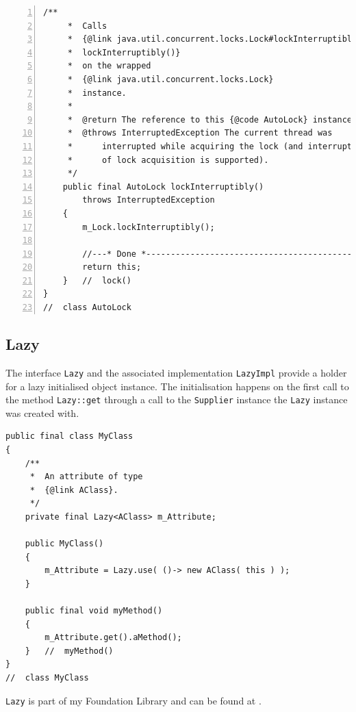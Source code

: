 \documentclass[11pt,a4paper, titlepage, parskip=half, headsepline, footsepline, cleardoublepage=current, headheight=1cm]{scrbook}
\begin{document}
\begin{lstlisting}[numbers=left,caption={AutoLock.java}]
    /**
     *  Calls
     *  {@link java.util.concurrent.locks.Lock#lockInterruptibly()
     *  lockInterruptibly()}
     *  on the wrapped
     *  {@link java.util.concurrent.locks.Lock}
     *  instance.
     *
     *  @return The reference to this {@code AutoLock} instance.
     *  @throws InterruptedException The current thread was
     *      interrupted while acquiring the lock (and interruption
     *      of lock acquisition is supported).
     */
    public final AutoLock lockInterruptibly() 
        throws InterruptedException
    {
        m_Lock.lockInterruptibly();
        
        //---* Done *------------------------------------------------
        return this;
    }   //  lock()
}
//  class AutoLock
\end{lstlisting}

\subsection{Lazy}\label{sec:Lazy}
The interface \lstinline|Lazy| and the associated implementation \lstinline|LazyImpl| provide a holder for a lazy initialised object instance. The initialisation happens on the first call to the method \lstinline|Lazy::get| through a call to the \lstinline|Supplier| instance the \lstinline|Lazy| instance was created with.

\begin{lstlisting}
public final class MyClass
{
    /**
     *  An attribute of type
     *  {@link AClass}.
     */
    private final Lazy<AClass> m_Attribute;
    
    public MyClass()
    {
        m_Attribute = Lazy.use( ()-> new AClass( this ) );
    }
    
    public final void myMethod()
    {
        m_Attribute.get().aMethod();
    }   //  myMethod()
}
//  class MyClass
\end{lstlisting}

\lstinline|Lazy| is part of my Foundation Library and can be found at \autocite{TQUADRAT_ORG_FOUNDATION_LAZY}.
\end{document}

